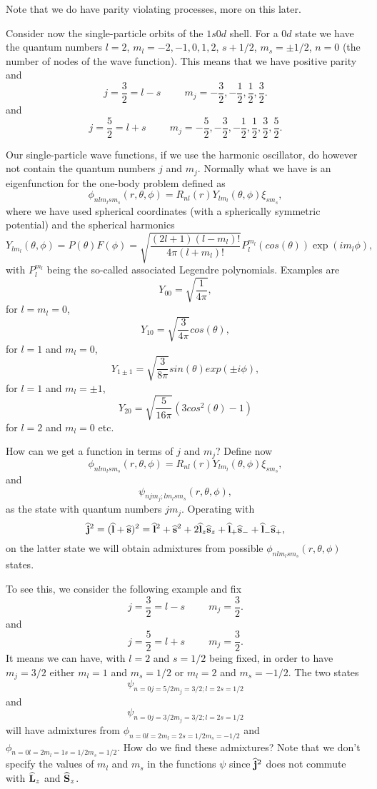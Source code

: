\begin{enumerate}
Note that we do have parity violating processes, more on this later. 

Consider now the single-particle orbits of the $1s0d$ shell. 
For a $0d$ state we have the quantum numbers $l=2$, $m_l=-2,-1,0,1,2$, $s+1/2$, $m_s=\pm 1/2$,
$n=0$ (the number of nodes of the wave function).   This means that we have positive parity and
\[
j=\frac{3}{2}=l-s\hspace{1cm} m_j=-\frac{3}{2},-\frac{1}{2},\frac{1}{2},\frac{3}{2}.
\]
and
\[
j=\frac{5}{2}=l+s\hspace{1cm} m_j=-\frac{5}{2},-\frac{3}{2},-\frac{1}{2},\frac{1}{2},\frac{3}{2},\frac{5}{2}.
\]

Our single-particle wave functions, if we use the harmonic oscillator, do however not contain the quantum numbers $j$ and $m_j$.
Normally what we have is an eigenfunction for the one-body problem defined as
\[
\phi_{nlm_lsm_s}(r,\theta,\phi)=R_{nl}(r)Y_{lm_l}(\theta,\phi)\xi_{sm_s},
\]
where we have used spherical coordinates (with a spherically symmetric potential) and the spherical harmonics 
\[
    Y_{lm_l}(\theta,\phi)=P(\theta)F(\phi)=\sqrt{\frac{(2l+1)(l-m_l)!}{4\pi (l+m_l)!}}
                      P_l^{m_l}(cos(\theta))\exp{(im_l\phi)},
\]
with $P_l^{m_l}$ being the so-called associated Legendre polynomials. 
Examples are
\[
   Y_{00}=\sqrt{\frac{1}{4\pi}},
\]
for $l=m_l=0$, 
\[
   Y_{10}=\sqrt{\frac{3}{4\pi}}cos(\theta),
\]
for $l=1$ and $m_l=0$, 
\[
   Y_{1\pm 1}=\sqrt{\frac{3}{8\pi}}sin(\theta)exp(\pm i\phi),
\]
for  $l=1$ and $m_l=\pm 1$, 
\[
   Y_{20}=\sqrt{\frac{5}{16\pi}}(3cos^2(\theta)-1)
\]
for $l=2$ and $m_l=0$ etc. 

How can we get a function in terms of $j$ and $m_j$?
Define now
\[
\phi_{nlm_lsm_s}(r,\theta,\phi)=R_{nl}(r)Y_{lm_l}(\theta,\phi)\xi_{sm_s},
\]
and 
\[
\psi_{njm_j;lm_lsm_s}(r,\theta,\phi),
\]
as the state with quantum numbers $jm_j$.
Operating with 
\[
   {\bf\widehat{j}}^2=({\bf\widehat{l}}+{\bf\widehat{s}})^2={\bf\widehat{l}}^2+{\bf\widehat{s}}^2+2{\bf\widehat{l}}_z{\bf\widehat{s}}_z+{\bf\widehat{l}}_+{\bf\widehat{s}}_{-}+{\bf\widehat{l}}_{-}{\bf\widehat{s}}_{+},
\]
on the latter state we will obtain admixtures from possible $\phi_{nlm_lsm_s}(r,\theta,\phi)$ states.

To see this, we consider the following example and fix
\[
j=\frac{3}{2}=l-s\hspace{1cm} m_j=\frac{3}{2}.
\]
and
\[
j=\frac{5}{2}=l+s\hspace{1cm} m_j=\frac{3}{2}.
\]
It means we can have, with $l=2$ and $s=1/2$ being fixed, in order to have $m_j=3/2$ either $m_l=1$ and $m_s=1/2$ or
$m_l=2$ and $m_s=-1/2$. The two states    
\[
\psi_{n=0j=5/2m_j=3/2;l=2s=1/2}
\]
and
\[
\psi_{n=0j=3/2m_j=3/2;l=2s=1/2}
\]
will have admixtures from $\phi_{n=0l=2m_l=2s=1/2m_s=-1/2}$ and $\phi_{n=0l=2m_l=1s=1/2m_s=1/2}$. 
How do we find these admixtures? Note that we don't specify the values of $m_l$ and $m_s$ 
in the functions $\psi$ since    
${\bf\widehat{j}}^2$ does not commute with ${\bf\widehat{L}}_z$ and ${\bf\widehat{S}}_z$. 


\end{enumerate}
